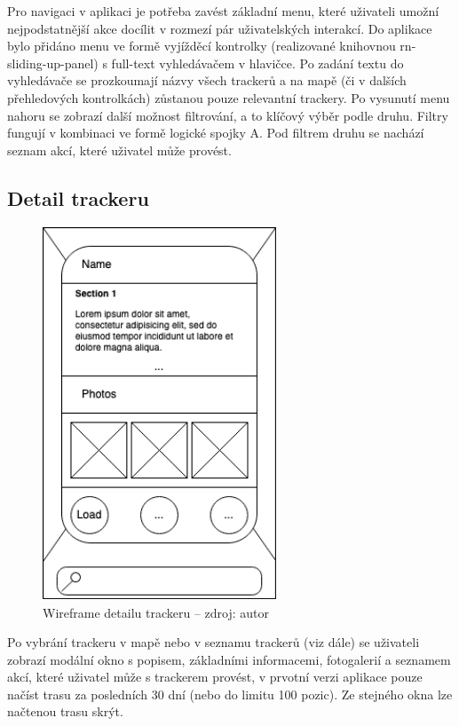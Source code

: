 Pro navigaci v aplikaci je potřeba zavést základní menu, které uživateli umožní nejpodstatnější akce docílit v rozmezí pár uživatelských interakcí. Do aplikace bylo přidáno menu ve formě vyjížděcí kontrolky (realizované knihovnou rn-sliding-up-panel) s full-text vyhledávačem v hlavičce. Po zadání textu do vyhledávače se prozkoumají názvy všech trackerů a na mapě (či v dalších přehledových kontrolkách) zůstanou pouze relevantní trackery. Po vysunutí menu nahoru se zobrazí další možnost filtrování, a to klíčový výběr podle druhu. Filtry fungují v kombinaci ve formě logické spojky A. Pod filtrem druhu se nachází seznam akcí, které uživatel může provést. 

\subsection{Detail trackeru}

\begin{figure}[H]
	\begin{center}
		\includegraphics[width=70mm]{img/wf_trackingdetail.png}
	\end{center}
	\caption[Wireframe detailu trackeru]{Wireframe detailu trackeru -- zdroj: autor}
\end{figure}

Po vybrání trackeru v mapě nebo v seznamu trackerů (viz dále) se uživateli zobrazí modální okno s popisem, základními informacemi, fotogalerií a seznamem akcí, které uživatel může s trackerem provést, v prvotní verzi aplikace pouze načíst trasu za posledních 30 dní (nebo do limitu 100 pozic). Ze stejného okna lze načtenou trasu skrýt.

